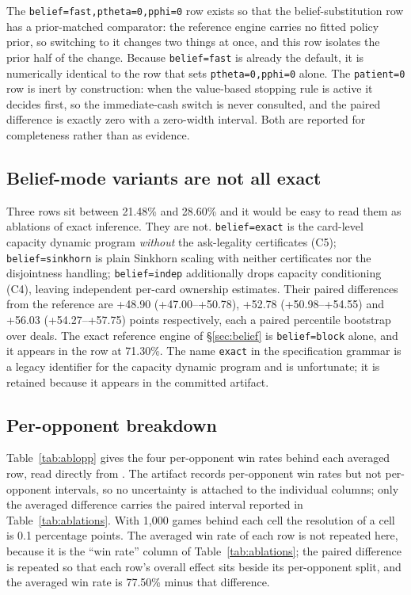 \documentclass[11pt]{article}
\theoremstyle{definition}
\newcommand{\numAblRef}{77.50}
\newcommand{\numAblCFive}{+48.90}
\newcommand{\numAblCFiveCI}{+47.00--+50.78}
\newcommand{\numAblGames}{1{,}000}
\newcommand{\numAblCFiveAbs}{28.60}
\newcommand{\numAblCFourAbs}{21.48}
\newcommand{\numAblBlockAbs}{71.30}
\newcommand{\numAblCFour}{+56.03}
\newcommand{\numAblCFourCI}{+54.27--+57.75}
\newcommand{\numAblSinkhorn}{+52.78}
\newcommand{\numAblSinkhornCI}{+50.98--+54.55}
\begin{document}
The \texttt{belief=fast,ptheta=0,pphi=0} row exists so that the belief-substitution
row has a prior-matched comparator: the reference engine carries no fitted
policy prior, so switching to it changes two things at once, and this row
isolates the prior half of the change. Because \texttt{belief=fast} is already
the default, it is numerically identical to the row that sets
\texttt{ptheta=0,pphi=0} alone. The \texttt{patient=0} row is inert by
construction: when the
value-based stopping rule is active it decides first, so the immediate-cash
switch is never consulted, and the paired difference is exactly zero with a
zero-width interval. Both are reported for completeness rather than as
evidence.

\subsection{Belief-mode variants are not all exact}
\label{app:abl-beliefmodes}

Three rows sit between \numAblCFourAbs\% and \numAblCFiveAbs\% and it would be
easy to read them as ablations of exact inference. They are not.
\texttt{belief=exact} is the card-level capacity
dynamic program \emph{without} the ask-legality certificates (C5);
\texttt{belief=sinkhorn} is plain Sinkhorn scaling with neither certificates nor
the disjointness handling; \texttt{belief=indep} additionally drops capacity
conditioning (C4), leaving independent per-card ownership estimates. Their
paired differences from the reference are \numAblCFive{}
(\numAblCFiveCI{}), \numAblSinkhorn{} (\numAblSinkhornCI{}) and \numAblCFour{}
(\numAblCFourCI{}) points respectively, each a paired percentile bootstrap over
deals. The exact
reference engine of \S\ref{sec:belief} is \texttt{belief=block} alone, and it
appears in the row at \numAblBlockAbs\%. The name \texttt{exact} in the specification
grammar is a legacy identifier for the capacity dynamic program and is
unfortunate; it is retained because it appears in the committed artifact.

\subsection{Per-opponent breakdown}
\label{app:abl-peropponent}

Table~\ref{tab:ablopp} gives the four per-opponent win rates behind each
averaged row, read directly from
. The artifact records
per-opponent win rates but not per-opponent intervals, so no uncertainty is
attached to the individual columns; only the averaged difference carries the
paired interval reported in Table~\ref{tab:ablations}. With \numAblGames{}
games behind each cell the resolution of a cell is 0.1 percentage points. The
averaged win rate of each row is not repeated here, because it is the ``win
rate'' column of Table~\ref{tab:ablations}; the paired difference is repeated so
that each row's overall effect sits beside its per-opponent split, and the
averaged win rate is \numAblRef\% minus that difference.
\end{document}
